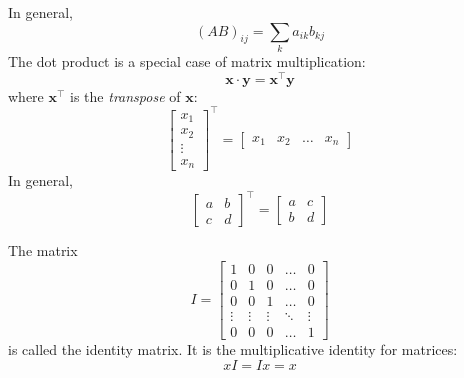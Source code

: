 \documentclass{scrartcl}
\renewcommand{\vec}{\mathbold}
\begin{document}
In general,
\[
(AB)_{ij}=\sum_{k} a_{ik}b_{kj}
\]
The dot product is a special case of matrix multiplication:
\[
  \vec x\cdot \vec y=\vec x^\top \vec y
\]
where $\vec x^\top$ is the \emph{transpose} of $\vec x$:
\[
  \begin{bmatrix}
    x_1 \\ x_2 \\ \vdots \\ x_n
  \end{bmatrix}^\top
  =
  \begin{bmatrix}
    x_1 & x_2 & \dots & x_n
  \end{bmatrix}
\]
In general,
\[
  \begin{bmatrix}
    a & b \\ c & d
  \end{bmatrix}^\top =
  \begin{bmatrix}
    a & c \\ b & d
  \end{bmatrix}
\]

The matrix
\[
  I =
  \begin{bmatrix}
    1 & 0 & 0 &\dots& 0 \\
    0 & 1 & 0 &\dots& 0 \\
    0 & 0 & 1 &\dots& 0 \\
    \vdots & \vdots & \vdots & \ddots & \vdots\\
    0 & 0 & 0 & \dots & 1
  \end{bmatrix}
\]
is called the identity matrix. It is the multiplicative identity for matrices:
\[
  xI=Ix=x
\]
\end{document}
